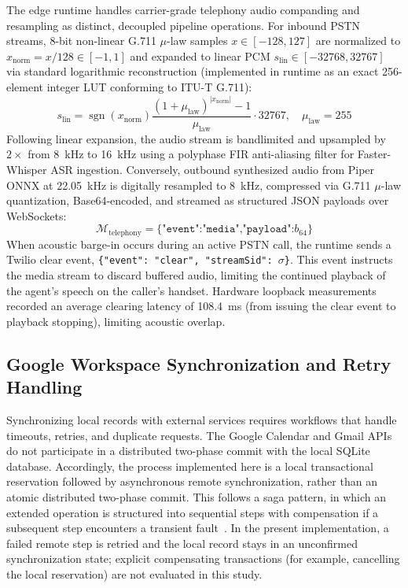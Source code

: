 \documentclass[review,12pt,times,authoryear]{elsarticle}
\theoremstyle{definition}
\begin{document}
The edge runtime handles carrier-grade telephony audio companding and resampling as distinct, decoupled pipeline operations. For inbound PSTN streams, 8-bit non-linear G.711 $\mu$-law samples $x \in [-128, 127]$ are normalized to $x_{\mathrm{norm}} = x / 128 \in [-1, 1]$ and expanded to linear PCM $s_{\mathrm{lin}} \in [-32768, 32767]$ via standard logarithmic reconstruction (implemented in runtime as an exact 256-element integer LUT conforming to ITU-T G.711):
\begin{equation}
  s_{\mathrm{lin}} = \operatorname{sgn}(x_{\mathrm{norm}}) \frac{(1 + \mu_{\mathrm{law}})^{|x_{\mathrm{norm}}|} - 1}{\mu_{\mathrm{law}}} \cdot 32767, \quad \mu_{\mathrm{law}} = 255
\end{equation}
Following linear expansion, the audio stream is bandlimited and upsampled by $2\times$ from \SI{8}{\kilo\hertz} to \SI{16}{\kilo\hertz} using a polyphase FIR anti-aliasing filter for Faster-Whisper ASR ingestion. Conversely, outbound synthesized audio from Piper ONNX at \SI{22.05}{\kilo\hertz} is digitally resampled to \SI{8}{\kilo\hertz}, compressed via G.711 $\mu$-law quantization, Base64-encoded, and streamed as structured JSON payloads over WebSockets:
\begin{equation}
  \mathcal{M}_{\mathrm{telephony}} = \texttt{\{"event":"media","payload":} b_{64} \texttt{\}}
\end{equation}
When acoustic barge-in occurs during an active PSTN call, the runtime sends a Twilio clear event, \texttt{\{"event": "clear", "streamSid": $\sigma$\}}. This event instructs the media stream to discard buffered audio, limiting the continued playback of the agent's speech on the caller's handset. Hardware loopback measurements recorded an average clearing latency of \SI{108.4}{\milli\second} (from issuing the clear event to playback stopping), limiting acoustic overlap.

\subsection{Google Workspace Synchronization and Retry Handling}
Synchronizing local records with external services requires workflows that handle timeouts, retries, and duplicate requests. The Google Calendar and Gmail APIs do not participate in a distributed two-phase commit with the local SQLite database. Accordingly, the process implemented here is a local transactional reservation followed by asynchronous remote synchronization, rather than an atomic distributed two-phase commit. This follows a saga pattern, in which an extended operation is structured into sequential steps with compensation if a subsequent step encounters a transient fault~\citep{GarciaMolina1987}. In the present implementation, a failed remote step is retried and the local record stays in an unconfirmed synchronization state; explicit compensating transactions (for example, cancelling the local reservation) are not evaluated in this study.
\end{document}
